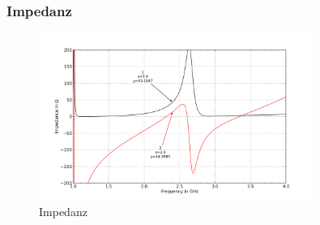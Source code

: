 \subsubsection{Impedanz}
\begin{figure}[h!]
	\centering
	\includegraphics[width=0.8\textwidth]{../fig/plt/crazy_stuff_l2_z.png}
	\caption{Impedanz}
\end{figure}

\clearpage

